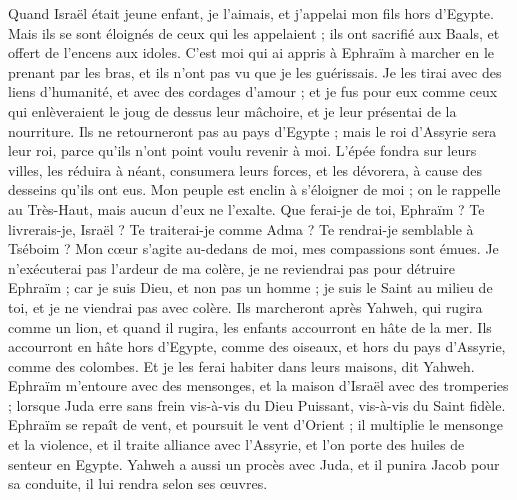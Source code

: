 \begin{multicols}{2}
\VerseOne{}Quand Israël était jeune enfant, je l'aimais, et j'appelai mon fils hors d'Egypte.
Mais ils se sont éloignés de ceux qui les appelaient ; ils ont sacrifié aux Baals, et offert de l’encens aux idoles.
C’est moi qui ai appris à Ephraïm à marcher en le prenant par les bras, et ils n'ont pas vu que je les guérissais.
Je les tirai avec des liens d'humanité, et avec des cordages d'amour ; et je fus pour eux comme ceux qui enlèveraient le joug de dessus leur mâchoire, et je leur présentai de la nourriture.
Ils ne retourneront pas au pays d'Egypte ; mais le roi d'Assyrie sera leur roi, parce qu'ils n'ont point voulu revenir à moi.
L'épée fondra sur leurs villes, les réduira à néant, consumera leurs forces, et les dévorera, à cause des desseins qu’ils ont eus.
Mon peuple est enclin à s’éloigner de moi ; on le rappelle au Très-Haut, mais aucun d'eux ne l'exalte.
Que ferai-je de toi, Ephraïm ? Te livrerais-je, Israël ? Te traiterai-je comme Adma ? Te rendrai-je semblable à Tséboim ? Mon cœur s’agite au-dedans de moi, mes compassions sont émues.
Je n'exécuterai pas l'ardeur de ma colère, je ne reviendrai pas pour détruire Ephraïm ; car je suis Dieu, et non pas un homme ; je suis le Saint au milieu de toi, et je ne viendrai pas avec colère.
Ils marcheront après Yahweh, qui rugira comme un lion, et quand il rugira, les enfants accourront en hâte de la mer.
Ils accourront en hâte hors d'Egypte, comme des oiseaux, et hors du pays d'Assyrie, comme des colombes. Et je les ferai habiter dans leurs maisons, dit Yahweh.
\VerseOne{}Ephraïm m'entoure avec des mensonges, et la maison d'Israël avec des tromperies ; lorsque Juda erre sans frein vis-à-vis du Dieu Puissant, vis-à-vis du Saint fidèle.
Ephraïm se repaît de vent, et poursuit le vent d'Orient ; il multiplie le mensonge et la violence, et il traite alliance avec l'Assyrie, et l'on porte des huiles de senteur en Egypte.
Yahweh a aussi un procès avec Juda, et il punira Jacob pour sa conduite, il lui rendra selon ses œuvres.

\end{multicols}
